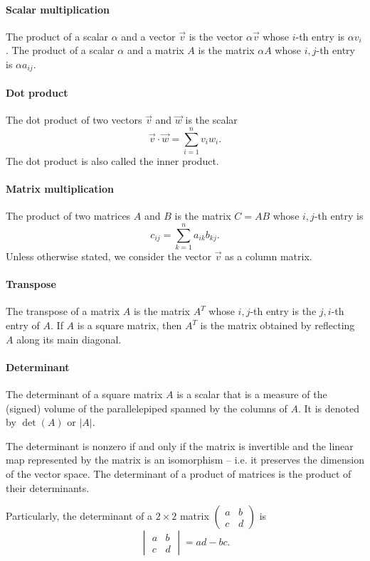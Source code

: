 \paragraph{Scalar multiplication}  The product of a scalar $\alpha$ and a vector $\vec{v}$
is the vector $\alpha \vec{v}$ whose $i$-th entry is $\alpha v_i$.  The product of a
scalar $\alpha$ and a matrix $A$ is the matrix $\alpha A$ whose $i, j$-th entry is
$\alpha a_{ij}$.

\paragraph{Dot product}  The dot product of two vectors $\vec{v}$ and $\vec{w}$ is the
scalar $$\vec{v} \cdot \vec{w} = \sum_{i = 1}^n v_i w_i\text{.}$$  The dot product is also called
the inner product.

\paragraph{Matrix multiplication}  The product of two matrices $A$ and $B$ is the matrix
$C = A B$ whose $i, j$-th entry is $$c_{ij} = \sum_{k = 1}^n a_{ik} b_{kj}\text{.}$$
Unless otherwise stated, we consider the vector $\vec{v}$ as a column matrix.

\paragraph{Transpose}  The transpose of a matrix $A$ is the matrix $A^T$ whose $i, j$-th
entry is the $j, i$-th entry of $A$.  If $A$ is a square matrix, then $A^T$ is the
matrix obtained by reflecting $A$ along its main diagonal.

\paragraph{Determinant}  The determinant of a square matrix $A$ is a scalar that is a
measure of the (signed) volume of the parallelepiped spanned by the columns of $A$.  It is
denoted by $\det(A)$ or $|A|$.

The determinant is nonzero if and only if the matrix is invertible and the linear map
represented by the matrix is an isomorphism -- i.e. it preserves the dimension of the
vector space.  The determinant of a product of matrices is the product of their
determinants.

Particularly, the determinant of a $2 \times 2$ matrix $\begin{pmatrix} a & b \\ c & d
\end{pmatrix}$ is $$\begin{vmatrix} a & b \\ c & d \end{vmatrix} = ad - bc\text{.}$$

